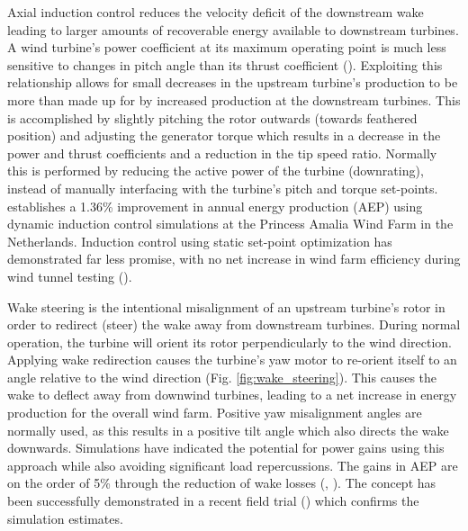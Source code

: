 Axial induction control reduces the velocity deficit of the downstream wake leading to larger amounts of recoverable energy available to downstream turbines. A wind turbine's power coefficient at its maximum operating point is much less sensitive to changes in pitch angle than its thrust coefficient (\cite{annoni_analysis_2016}). Exploiting this relationship allows for small decreases in the upstream turbine's production to be more than made up for by increased production at the downstream turbines. This is accomplished by slightly pitching the rotor outwards (towards feathered position) and adjusting the generator torque which results in a decrease in the power and thrust coefficients and a reduction in the tip speed ratio. Normally this is performed by reducing the active power of the turbine (downrating), instead of manually interfacing with the turbine's pitch and torque set-points. \cite{gebraad_maximum_2015} establishes a 1.36\% improvement in annual energy production (AEP) using dynamic induction control simulations at the Princess Amalia Wind Farm in the Netherlands. Induction control using static set-point optimization has demonstrated far less promise, with no net increase in wind farm efficiency during wind tunnel testing (\cite{bartl_experimental_2016}).

Wake steering is the intentional misalignment of an upstream turbine's rotor in order to redirect (steer) the wake away from downstream turbines. During normal operation, the turbine will orient its rotor perpendicularly to the wind direction. Applying wake redirection causes the turbine's yaw motor to re-orient itself to an angle relative to the wind direction (Fig. \ref{fig:wake_steering}). This causes the wake to deflect away from downwind turbines, leading to a net increase in energy production for the overall wind farm. Positive yaw misalignment angles are normally used, as this results in a positive tilt angle which also directs the wake downwards. Simulations have indicated the potential for power gains using this approach while also avoiding significant load repercussions. The gains in AEP are on the order of 5\% through the reduction of wake losses (\cite{knudsen_survey_2015}, \cite{gebraad_maximization_2017}). The concept has been successfully demonstrated in a recent field trial (\cite{fleming_field_2017}) which confirms the simulation estimates.

